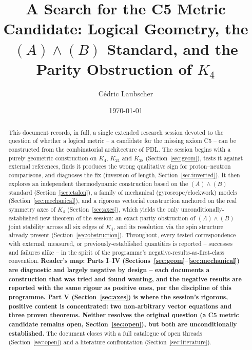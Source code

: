 \documentclass[11pt]{article}
\title{\texorpdfstring{A Search for the C5 Metric Candidate: Logical Geometry, the $(A)\wedge(B)$ Standard, and the Parity Obstruction of $K_4$}{A Search for the C5 Metric Candidate: Logical Geometry, the (A) AND (B) Standard, and the Parity Obstruction of K4}}
\author{C\'edric Laubscher}
\date{\today}
\begin{document}
\maketitle

\begin{abstract}
This document records, in full, a single extended research session devoted to the question of whether a logical metric -- a candidate for the missing axiom C5 -- can be constructed from the combinatorial architecture of PDL. The session begins with a purely geometric construction on $K_4$, $K_{24}$ and $K_{28}$ (Section~\ref{sec:geom}), tests it against external references, finds it produces the wrong qualitative sign for proton--neutron comparisons, and diagnoses the fix (inversion of length, Section~\ref{sec:inverted}). It then explores an independent thermodynamic construction based on the $(A)\wedge(B)$ standard \citep{D29} (Section~\ref{sec:etalon}), a family of mechanical (gyroscope/clockwork) models (Section~\ref{sec:mechanical}), and a rigorous vectorial construction anchored on the real symmetry axes of $K_4$ (Section~\ref{sec:axes}), which yields the only unconditionally-established new theorem of the session: an exact parity obstruction of $(A)\wedge(B)$ joint stability across all six edges of $K_4$, and its resolution via the spin structure already present \citep{D33} (Section~\ref{sec:obstruction}). Throughout, every tested correspondence with external, measured, or previously-established quantities is reported -- successes and failures alike -- in the spirit of the programme's negative-results-as-first-class convention. \textbf{Reader's map: Parts I--IV (Sections~\ref{sec:geom}--\ref{sec:mechanical}) are diagnostic and largely negative by design -- each documents a construction that was tried and found wanting, and the negative results are reported with the same rigour as positive ones, per the discipline of this programme. Part V (Section~\ref{sec:axes}) is where the session's rigorous, positive content is concentrated: two non-arbitrary vector equations and three proven theorems. Neither resolves the original question (a C5 metric candidate remains open, Section~\ref{sec:open}), but both are unconditionally established.} The document closes with a full catalogue of open threads (Section~\ref{sec:open}) and a literature confrontation (Section~\ref{sec:literature}).
\end{abstract}

\clearpage

\tableofcontents
\newpage
\end{document}
